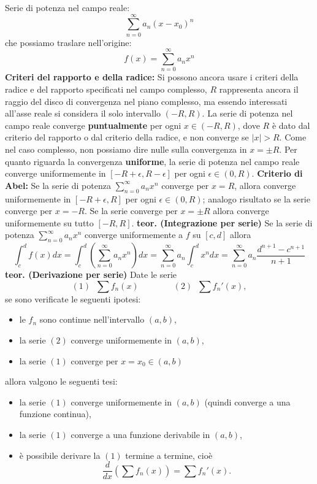 Serie di potenza nel campo reale:
\[
    \sum_{n=0}^{\infty} a_n(x-x_0)^n
\]
che possiamo traslare nell'origine:
\[
    f(x) = \sum_{n=0}^{\infty} a_n x^n
\]
\newline
\textbf{Criteri del rapporto e della radice:} Si possono ancora usare i criteri della radice e del rapporto specificati nel campo complesso, $R$ rappresenta ancora il raggio del disco di convergenza nel piano complesso, ma essendo interessati all'asse reale si considera il solo intervallo $(-R, R)$.\newline
La serie di potenza nel campo reale converge \textbf{puntualmente} per ogni $x \in (-R, R)$, dove $R$ è dato dal criterio del rapporto o dal criterio della radice, e non converge se $|x| > R$.\newline
Come nel caso complesso, non possiamo dire nulle sulla convergenza in $x = \pm R$.\newline
Per quanto riguarda la convergenza \textbf{uniforme}, la serie di potenza nel campo reale converge uniformemente in $[-R+\epsilon, R- \epsilon]$ per ogni $\epsilon \in (0,R)$.\newline
\newline
\textbf{Criterio di Abel:} Se la serie di potenza $\sum_{n=0}^{\infty} a_n x^n$ converge per $x = R$, allora converge uniformemente in $[-R + \epsilon, R]$ per ogni $\epsilon \in (0,R)$; analogo risultato se la serie converge per $x = -R$. Se la serie converge per $x = \pm R$ allora converge uniformemente su tutto $[-R, R]$.\newline
\newline
\textbf{teor. (Integrazione per serie)}\newline
Se la serie di potenza $\sum_{n=0}^{\infty} a_n x^n$ converge uniformemente a $f$ su $[c,d]$ allora
\[
    \int_{c}^{d}f(x) dx = \int_{c}^{d}\left(\sum_{n=0}^{\infty}a_n x^n\right)dx = \sum_{n=0}^{\infty}a_n \int_{c}^{d}x^n dx = \sum_{n=0}^{\infty} a_n \frac{d^{n+1}- c^{n+1}}{n+1}
\]
\newline
\textbf{teor. (Derivazione per serie)}\newline
Date le serie
\[
    (1) \;\; \sum f_n(x) \quad \quad \quad \quad (2) \;\; \sum f_n'(x),
\]
se sono verificate le seguenti ipotesi:
\begin{itemize}
    \item le $f_n$ sono continue nell'intervallo $(a,b)$,
    \item la serie $(2)$ converge uniformemente in $(a,b)$,
    \item la serie $(1)$ converge per $x = x_0 \in (a,b)$  
\end{itemize}
allora valgono le seguenti tesi:
\begin{itemize}
    \item la serie $(1)$ converge uniformemente in $(a,b)$ (quindi converge a una funzione continua),
    \item la serie $(1)$ converge a una funzione derivabile in $(a,b)$,
    \item è possibile derivare la $(1)$ termine a termine, cioè
    \[
        \frac{d}{dx}\left(\sum f_n(x)\right) = \sum f_n'(x).
    \]
\end{itemize}
